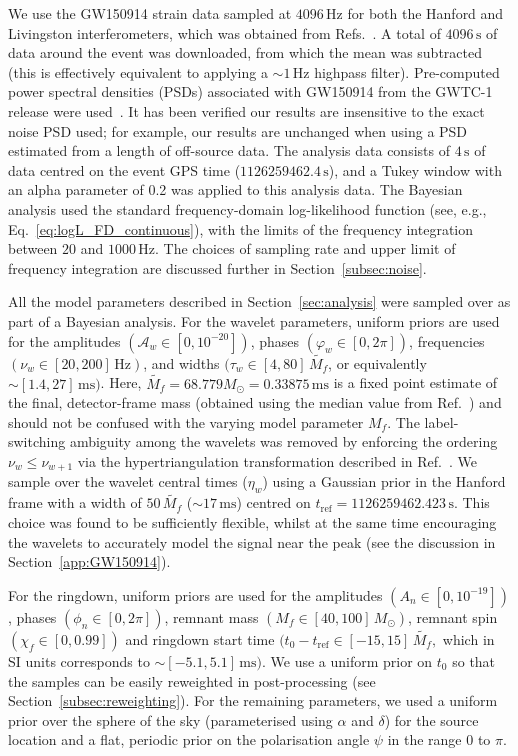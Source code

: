 We use the GW150914 strain data sampled at $4096\, \mathrm{Hz}$ for both the Hanford and Livingston interferometers, which was obtained from Refs.~\cite{gwosc, LIGOScientific:2019lzm}.
A total of $4096\,\mathrm{s}$ of data around the event was downloaded, from which the mean was subtracted (this is effectively equivalent to applying a $\sim 1\, \mathrm{Hz}$ highpass filter). 
Pre-computed power spectral densities (PSDs) associated with GW150914 from the GWTC-1 release were used~\cite{gwtc1psds}. 
It has been verified our results are insensitive to the exact noise PSD used; for example, our results are unchanged when using a PSD estimated from a length of off-source data.
The analysis data consists of $4\,\mathrm{s}$ of data centred on the event GPS time ($1126259462.4\,\mathrm{s}$), and a Tukey window with an alpha parameter of 0.2 was applied to this analysis data.
The Bayesian analysis used the standard frequency-domain log-likelihood function (see, e.g., Eq.~\ref{eq:logL_FD_continuous}), with the limits of the frequency integration between $20$ and $1000\, \mathrm{Hz}$.
The choices of sampling rate and upper limit of frequency integration are discussed further in Section~\ref{subsec:noise}.

All the model parameters described in Section~\ref{sec:analysis} were sampled over as part of a Bayesian analysis.
For the wavelet parameters, uniform priors are used for the amplitudes $(\mathcal{A}_w \in [0,10^{-20}])$, phases $(\varphi_w \in [0,2\pi])$, frequencies $(\nu_w \in [20,200]\, \mathrm{Hz})$, and widths $(\tau_w \in [4,80]\, \tilde{M_f}$, or equivalently $\sim[1.4,27]\, \mathrm{ms})$.
Here, $\tilde{M_f}=68.779M_\odot=0.33875\,\mathrm{ms}$ is a fixed point estimate of the final, detector-frame mass (obtained using the median value from Ref.~\cite{LIGOScientific:2018mvr}) and should not be confused with the varying model parameter $M_f$.
The label-switching ambiguity among the wavelets was removed by enforcing the ordering 
$ \nu_w \leq \nu_{w+1} $ via the hypertriangulation transformation described in Ref.~\cite{Buscicchio:2019rir}.
We sample over the wavelet central times ($\eta_w$) using a Gaussian prior in the Hanford frame with a width of $50\,\tilde{M_f}$ ($\sim 17\,\mathrm{ms}$) centred on $t_\mathrm{ref} = 1126259462.423\,\mathrm{s}$.
This choice was found to be sufficiently flexible, whilst at the same time encouraging the wavelets to accurately model the signal near the peak (see the discussion in Section~\ref{app:GW150914}).

For the ringdown, uniform priors are used for the amplitudes $(A_n \in [0,10^{-19}])$, phases $(\phi_n \in [0,2\pi])$, remnant mass $(M_f \in [40,100]\,M_\odot )$, remnant spin $(\chi_f \in [0,0.99])$ and ringdown start time $(t_0-t_\mathrm{ref} \in [-15, 15]\,\tilde{M_f},$ which in SI units corresponds to $\sim[-5.1,5.1]\, \mathrm{ms})$.
We use a uniform prior on $t_0$ so that the samples can be easily reweighted in post-processing (see Section~\ref{subsec:reweighting}). 
For the remaining parameters, we used a uniform prior over the sphere of the sky (parameterised using $\alpha$ and $\delta$) for the source location and a flat, periodic prior on the polarisation angle $\psi$ in the range $0$ to $\pi$.

